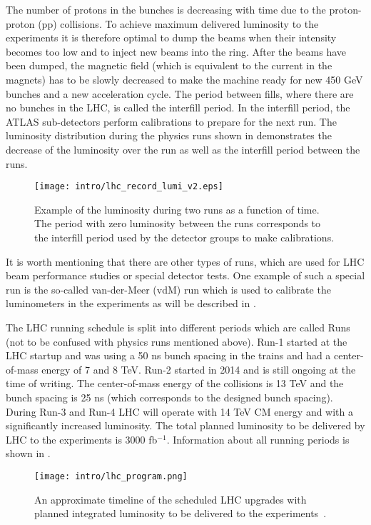 The number of protons in the bunches is decreasing with time due to the proton-proton (pp) collisions.
To achieve maximum delivered luminosity to the experiments 
it is therefore optimal to dump the beams when their intensity becomes too low and to inject new beams into the ring.
After the beams have been dumped, the magnetic field (which is equivalent to the current in the magnets) has to be slowly decreased to make the machine ready for new 450 GeV bunches and a new acceleration cycle.
The period between fills, where there are no bunches in the LHC, is called the interfill period. In the interfill period, the ATLAS sub-detectors perform calibrations to prepare for the next run. 
The luminosity distribution during the physics runs shown in  demonstrates
the decrease of the luminosity over the run as well as the interfill period between the runs. 

\begin{figure}[]
  \centering
\texttt{[image: intro/lhc\_record\_lumi\_v2.eps]}
\caption{Example of the luminosity during two runs as a function of time. The period with zero luminosity between the runs corresponds to the interfill period used by the detector groups to make calibrations.}
\label{fig:interfill}
\end{figure}


It is worth mentioning that there are other types of runs, which are used for LHC beam performance studies or special detector tests.
One example of such a special run is the so-called van-der-Meer (vdM) run which is used to calibrate  the luminometers in the experiments as will be described in .

The LHC running schedule is split into different periods which are called Runs (not to be confused with physics runs mentioned above). Run-1 started at the LHC startup and was using a 50 ns bunch spacing in the trains and had a center-of-mass energy of 7 and 8 TeV. 
Run-2 started in 2014 and is still ongoing at the time of writing. The center-of-mass energy of the collisions is 13 TeV and the bunch spacing is 25 ns (which corresponds to the designed bunch spacing).
During Run-3 and Run-4 LHC will operate with 14 TeV CM energy and with a significantly increased luminosity. The total planned luminosity to be delivered by LHC to the experiments is 3000 fb$^{-1}$.
Information about all running periods is shown in .

\begin{figure}[]
  \centering
\texttt{[image: intro/lhc\_program.png]}
\caption{An approximate timeline of the scheduled LHC upgrades with planned integrated luminosity to be delivered to the experiments~\cite{Kawamoto:1552862}.}
\label{fig:lhc_program}
\end{figure}


